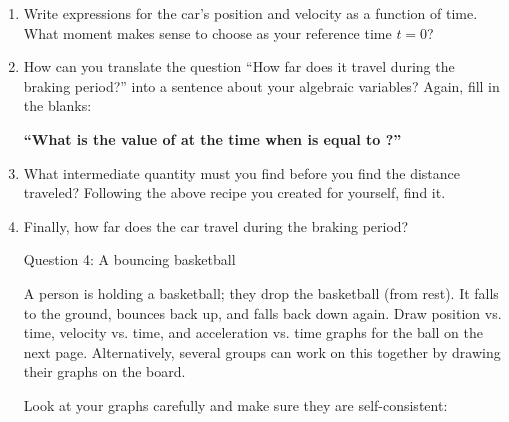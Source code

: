 \documentclass[12pt]{article}
\def\BS{\bigskip}
\begin{document}
\begin{enumerate}
	\item Write expressions for the car's position and velocity as a function of time. What moment makes sense to choose as your reference time $t=0$?
	
	\vspace{1in}
	
	
	\item How can you translate the question ``How far does it travel during the braking period?'' into a sentence about your algebraic variables? Again, fill in the blanks: 
	
	\begin{center}
		{\bf ``What is the value of \underline{\hspace{0.7in}} at the time when \underline{\hspace{0.7in}} is equal to \underline{\hspace{0.7in}}?''} 
	\end{center}
	
	
	\item What intermediate quantity must you find before you find the distance traveled? Following the above recipe you created for yourself, find it.
	
	
	
	
	\vspace{2in}
	
	
	
	
	
	\item Finally, how far does the car travel during the braking period?
	
	\newpage


\centerline{\Large Question 4: A bouncing basketball}

\BS

A person is holding a basketball; they drop the basketball (from rest). It falls to the ground, bounces back up, and falls back down again. Draw position vs. time, velocity vs. time, and acceleration vs. time graphs for the ball on the next page. Alternatively, several groups can work on this together by drawing their graphs on the board.

Look at your graphs carefully and make sure they are self-consistent:



\end{enumerate}
\end{document}
